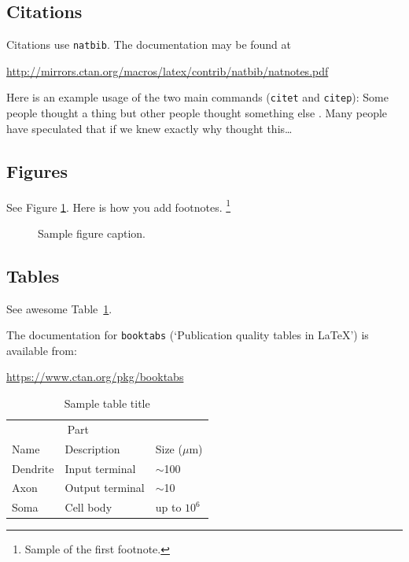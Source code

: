 \documentclass{article}
\begin{document}
\subsection{Citations}
Citations use \verb+natbib+. The documentation may be found at
\begin{center}
	\url{http://mirrors.ctan.org/macros/latex/contrib/natbib/natnotes.pdf}
\end{center}

Here is an example usage of the two main commands (\verb+citet+ and \verb+citep+): Some people thought a thing \citep{kour2014real, keshet2016prediction} but other people thought something else \citep{kour2014fast}. Many people have speculated that if we knew exactly why \citet{kour2014fast} thought this\dots

\subsection{Figures}
\lipsum[10]
See Figure \ref{fig:fig1}. Here is how you add footnotes. \footnote{Sample of the first footnote.}
\lipsum[11]

\begin{figure}
	\centering
	\fbox{\rule[-.5cm]{4cm}{4cm} \rule[-.5cm]{4cm}{0cm}}
	\caption{Sample figure caption.}
	\label{fig:fig1}
\end{figure}

\subsection{Tables}
See awesome Table~\ref{tab:table}.

The documentation for \verb+booktabs+ (`Publication quality tables in LaTeX') is available from:
\begin{center}
	\url{https://www.ctan.org/pkg/booktabs}
\end{center}

\begin{table}
	\caption{Sample table title}
	\centering
	\begin{tabular}{lll}
		\toprule
		\multicolumn{2}{c}{Part}                   \\
		\cmidrule(r){1-2}
		Name     & Description     & Size ($\mu$m) \\
		\midrule
		Dendrite & Input terminal  & $\sim$100     \\
		Axon     & Output terminal & $\sim$10      \\
		Soma     & Cell body       & up to $10^6$  \\
		\bottomrule
	\end{tabular}
	\label{tab:table}
\end{table}
\end{document}
